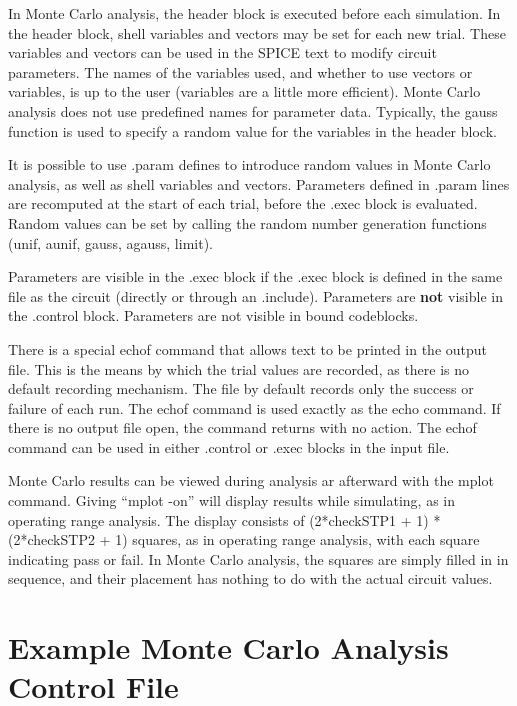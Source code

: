 In Monte Carlo analysis, the header block is executed before each
simulation.  In the header block, shell variables and vectors may be
set for each new trial.  These variables and vectors can be used in
the SPICE text to modify circuit parameters.  The names of the
variables used, and whether to use vectors or variables, is up to the
user (variables are a little more efficient).  Monte Carlo analysis
does not use predefined names for parameter data.  Typically, the {\vt
gauss} function is used to specify a random value for the variables
in the header block.

It is possible to use {\vt .param} defines to introduce random values
in Monte Carlo analysis, as well as shell variables and vectors. 
Parameters defined in {\vt .param} lines are recomputed at the start
of each trial, before the {\vt .exec} block is evaluated.  Random
values can be set by calling the random number generation functions
({\vt unif}, {\vt aunif}, {\vt gauss}, {\vt agauss}, {\vt limit}).

Parameters are visible in the {\vt .exec} block if the {\vt .exec}
block is defined in the same file as the circuit (directly or through
an {\vt .include}).  Parameters are {\bf not} visible in the {\vt
.control} block.  Parameters are not visible in bound codeblocks.

There is a special {\cb echof} command that allows text to be
printed in the output file.  This is the means by which the trial
values are recorded, as there is no default recording mechanism. 
The file by default records only the success or failure of each run. 
The {\cb echof} command is used exactly as the {\cb echo} command. 
If there is no output file open, the command returns with no action. 
The {\cb echof} command can be used in either {\vt .control} or {\vt
.exec} blocks in the input file.

Monte Carlo results can be viewed during analysis ar afterward with
the {\cb mplot} command.  Giving ``{\vt mplot -on}'' will display
results while simulating, as in operating range analysis.  The display
consists of {\vt (2*checkSTP1 + 1) * (2*checkSTP2 + 1)} squares, as in
operating range analysis, with each square indicating pass or fail. 
In Monte Carlo analysis, the squares are simply filled in in sequence,
and their placement has nothing to do with the actual circuit values.


\section{Example Monte Carlo Analysis Control File}


